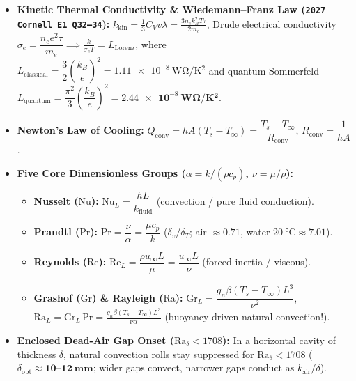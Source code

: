 \documentclass[10pt,twoside,openany,letterpaper]{book}
\begin{document}
\begin{quicksheet}
\begin{formulacard}
\begin{itemize}
\[  \]
  \item \textbf{Kinetic Thermal Conductivity \& Wiedemann--Franz Law (\texttt{2027 Cornell E1 Q32--34}):}
  $\displaystyle k_{\mathrm{kin}} = \frac{1}{3}C_V v\lambda = \frac{3 n_e k_B^2 T\tau}{2 m_e}$, Drude electrical conductivity $\sigma_e = \dfrac{n_e e^2\tau}{m_e} \implies \boxed{\frac{k}{\sigma_e T} = L_{\mathrm{Lorenz}}}$, where $L_{\mathrm{classical}} = \dfrac{3}{2}\left(\dfrac{k_B}{e}\right)^2 = \SI{1.11e-8}{\watt\ohm\per\kelvin^2}$ and quantum Sommerfeld $L_{\mathrm{quantum}} = \dfrac{\pi^2}{3}\left(\dfrac{k_B}{e}\right)^2 = \mathbf{\SI{2.44e-8}{\watt\ohm\per\kelvin^2}}$.
\end{itemize}
\end{formulacard}

\begin{twocol}[0.49]
\begin{formulacard}
\scriptsize
\begin{itemize}
  \item \textbf{Newton's Law of Cooling:} $\dot{Q}_{\mathrm{conv}} = h A(T_s - T_\infty) = \dfrac{T_s - T_\infty}{R_{\mathrm{conv}}}$, $R_{\mathrm{conv}} = \dfrac{1}{hA}$.
  \item \textbf{Five Core Dimensionless Groups ($\alpha = k/(\rho c_p)$, $\nu = \mu/\rho$):}
  \begin{itemize}
    \item \textbf{Nusselt ($\mathrm{Nu}$):} $\mathrm{Nu}_L = \dfrac{h L}{k_{\mathrm{fluid}}}$ (convection / pure fluid conduction).
    \item \textbf{Prandtl ($\mathrm{Pr}$):} $\mathrm{Pr} = \dfrac{\nu}{\alpha} = \dfrac{\mu c_p}{k}$ ($\delta_v/\delta_T$; air $\approx 0.71$, water $\SI{20}{\celsius}\approx 7.01$).
    \item \textbf{Reynolds ($\mathrm{Re}$):} $\mathrm{Re}_L = \dfrac{\rho u_\infty L}{\mu} = \dfrac{u_\infty L}{\nu}$ (forced inertia / viscous).
    \item \textbf{Grashof ($\mathrm{Gr}$) \& Rayleigh ($\mathrm{Ra}$):} $\mathrm{Gr}_L = \dfrac{g_n\beta(T_s - T_\infty)L^3}{\nu^2}$, $\boxed{\mathrm{Ra}_L = \mathrm{Gr}_L\,\mathrm{Pr} = \frac{g_n\beta(T_s - T_\infty)L^3}{\nu\alpha}}$ (buoyancy-driven natural convection!).
  \end{itemize}
  \item \textbf{Enclosed Dead-Air Gap Onset ($\mathrm{Ra}_\delta < 1708$):} In a horizontal cavity of thickness $\delta$, natural convection rolls stay suppressed for $\mathrm{Ra}_\delta < 1708$ ($\delta_{\mathrm{opt}} \approx \mathbf{10\text{--}\SI{12}{\milli\meter}}$; wider gaps convect, narrower gaps conduct as $k_{\mathrm{air}}/\delta$).

\end{itemize}
\end{formulacard}
\end{twocol}
\end{quicksheet}
\end{document}
